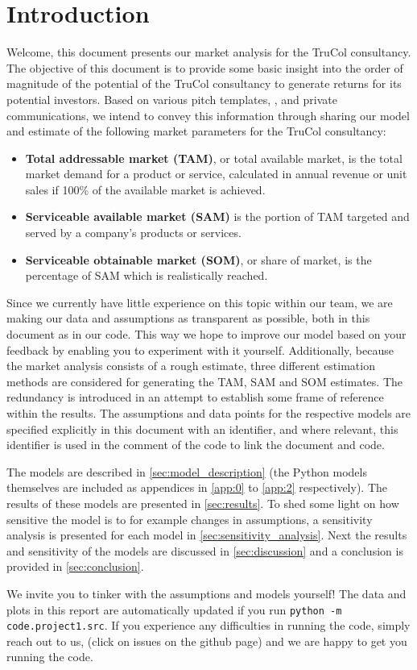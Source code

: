 \section{Introduction}\label{sec:intro}
Welcome, this document presents our market analysis for the TruCol consultancy. The objective of this document is to provide some basic insight into the order of magnitude of the potential of the TruCol consultancy to generate returns for its potential investors. Based on various pitch templates, \cite{kamps2020}, and private communications, we intend to convey this information through sharing our model and estimate of the following market parameters for the TruCol consultancy:

\begin{itemize}
	\item \textbf{Total addressable market (TAM)}, or total available market, is the total market demand for a product or service, calculated in annual revenue or unit sales if 100\% of the available market is achieved\cite{tam_sam_som}.
	\item \textbf{Serviceable available market (SAM)} is the portion of TAM targeted and served by a company's products or services\cite{tam_sam_som}.
	\item \textbf{Serviceable obtainable market (SOM)}, or share of market, is the percentage of SAM which is realistically reached\cite{tam_sam_som}.
\end{itemize}


\noindent Since we currently have little experience on this topic within our team, we are making our data and assumptions as transparent as possible, both in this document as in our code. This way we hope to improve our model based on your feedback by enabling you to experiment with it yourself. Additionally, because the market analysis consists of a rough estimate, three different estimation methods are considered for generating the TAM, SAM and SOM estimates. The redundancy is introduced in an attempt to establish some frame of reference within the results. %
The assumptions and data points for the respective models are specified explicitly in this document with an identifier, and where relevant, this identifier is used in the comment of the code to link the document and code. 

The models are described in \cref{sec:model_description} (the Python models themselves are included as appendices in \cref{app:0} to \cref{app:2} respectively). The results of these models are presented in \cref{sec:results}. To shed some light on how sensitive the model is to for example changes in assumptions, a sensitivity analysis is presented for each model in \cref{sec:sensitivity_analysis}. Next the results and sensitivity of the models are discussed in \cref{sec:discussion} and a conclusion is provided in \cref{sec:conclusion}.

We invite you to tinker with the assumptions and models yourself! The data and plots in this report are automatically updated if you run \verb+python -m code.project1.src+. If you experience any difficulties in running the code, simply reach out to us, (click on issues on the github page) and we are happy to get you running the code.
